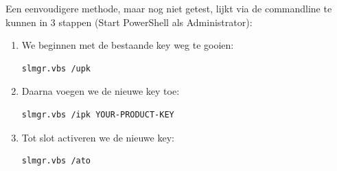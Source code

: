 Een eenvoudigere methode, maar nog niet getest, lijkt via de commandline te kunnen in 3 stappen (Start PowerShell als Administrator):
\begin{enumerate}
\item We beginnen met de bestaande key weg te gooien:
\begin{lstlisting}[language=bash]
slmgr.vbs /upk
\end{lstlisting}

\item Daarna voegen we de nieuwe key toe:
\begin{lstlisting}[language=bash]
slmgr.vbs /ipk YOUR-PRODUCT-KEY
\end{lstlisting}

\item Tot slot activeren we de nieuwe key:
\begin{lstlisting}[language=bash]
slmgr.vbs /ato
\end{lstlisting}
\end{enumerate}


